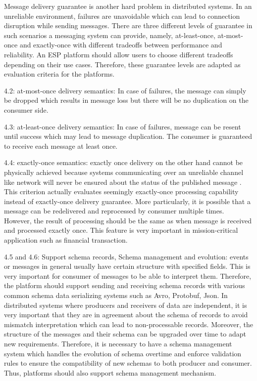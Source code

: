 Message delivery guarantee is another hard problem in distributed systems. In an unreliable environment, failures are unavoidable which can lead to connection disruption while sending messages. There are three different levels of guarantee in such scenarios a messaging system can provide, namely, at-least-once, at-most-once and exactly-once with different tradeoffs between performance and reliability. An ESP platform should allow users to choose different tradeoffs depending on their use cases. Therefore, these guarantee levels are adapted as evaluation criteria for the platforms.

4.2: at-most-once delivery semantics: In case of failures, the message can simply be dropped which results in message loss but there will be no duplication on the consumer side.

4.3: at-least-once delivery semantics: In case of failures, message can be resent until success which may lead to message duplication. The consumer is guaranteed to receive each message at least once. 

4.4: exactly-once semantics: exactly once delivery on the other hand cannot be physically achieved because systems communicating over an unreliable channel like network will never be ensured about the status of the published message \cite{exactlyoncenotpossible}. This criterion actually evaluates seemingly exactly-once processing capability instead of exactly-once delivery guarantee. More particularly, it is possible that a message can be redelivered and reprocessed by consumer multiple times. However, the result of processing should be the same as when message is received and processed exactly once. This feature is very important in mission-critical application such as financial transaction.

4.5 and 4.6: Support schema records, Schema management and evolution: events or messages in general usually have certain structure with specified fields. This is very important for consumer of messages to be able to interpret them. Therefore, the platform should support sending and receiving schema records with various common schema data serializing systems such as Avro, Protobuf, Json. 
In distributed systems where producers and receivers of data are independent, it is very important that they are in agreement about the schema of records to avoid mismatch interpretation which can lead to non-processable records. Moreover, the structure of the messages and their schema can be upgraded over time to adapt new requirements. Therefore, it is necessary to have a schema management system which handles the evolution of schema overtime and enforce validation rules to ensure the compatibility of new schemas to both producer and consumer. Thus, platforms should also support schema management mechanism.

